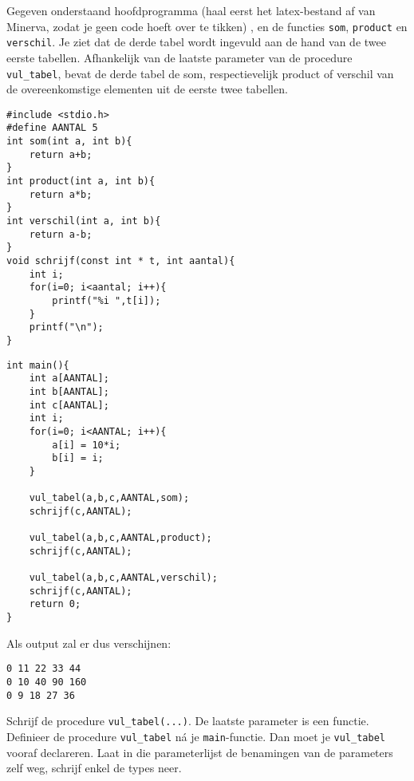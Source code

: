 \beginoef
Gegeven onderstaand hoofdprogramma  (haal eerst het latex-bestand af van Minerva, zodat je geen code hoeft over te tikken) , en de functies \verb}som}, \verb}product} en \verb}verschil}.
Je ziet dat de derde tabel wordt ingevuld aan de hand van de twee eerste tabellen. Afhankelijk van de 
laatste parameter van de procedure \verb}vul_tabel}, bevat de derde tabel de som, respectievelijk product of verschil van de overeenkomstige elementen
uit de eerste twee tabellen.
\begin{footnotesize}
\begin{minipage}[t]{9cm}
\begin{verbatim}
#include <stdio.h>
#define AANTAL 5
int som(int a, int b){
    return a+b;
}
int product(int a, int b){
    return a*b;
}
int verschil(int a, int b){
    return a-b;
}
void schrijf(const int * t, int aantal){	
    int i;
    for(i=0; i<aantal; i++){
        printf("%i ",t[i]);
    }
    printf("\n");
}
\end{verbatim}
\end{minipage}
\begin{minipage}[t]{8cm}
\begin{verbatim}
int main(){
    int a[AANTAL];
    int b[AANTAL];
    int c[AANTAL];
    int i;
    for(i=0; i<AANTAL; i++){
        a[i] = 10*i;
        b[i] = i;
    }
	
    vul_tabel(a,b,c,AANTAL,som);
    schrijf(c,AANTAL);
	
    vul_tabel(a,b,c,AANTAL,product);
    schrijf(c,AANTAL);
	
    vul_tabel(a,b,c,AANTAL,verschil);
    schrijf(c,AANTAL);
    return 0;
}
\end{verbatim}
\end{minipage}
\end{footnotesize} Als output zal er dus verschijnen:
\begin{verbatim}
0 11 22 33 44
0 10 40 90 160 
0 9 18 27 36 
\end{verbatim}
Schrijf de procedure \verb}vul_tabel(...)}. De laatste parameter is een functie. 
Definieer de procedure \verb}vul_tabel} n\'a je \verb}main}-functie. Dan moet je \verb}vul_tabel}
vooraf declareren. Laat in die parameterlijst de benamingen van de parameters zelf weg, schrijf enkel de types neer.

\endoef

